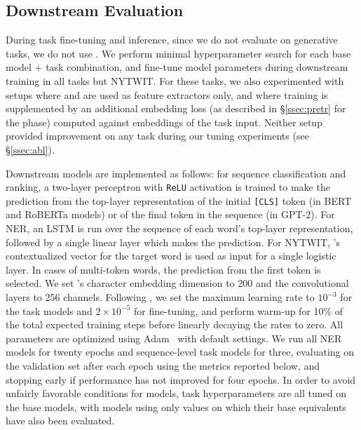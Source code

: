 

\subsection{Downstream Evaluation}
\label{ssec:finetune}

During task fine-tuning and inference,
since we do not evaluate on generative tasks, we do not use \detok{}.
We perform minimal hyperparameter search for each base model + task combination, and fine-tune model parameters during downstream training in all tasks but NYTWIT.
For these tasks, we also experimented with setups where \mmod{} and \tok{} are used as feature extractors only, and where \tok{} training is supplemented by an additional embedding loss (as described in \S\ref{ssec:pretr} for the \ppt{} phase) computed against embeddings of the task input.
Neither setup provided improvement on any task during our tuning experiments (see \S\ref{ssec:abl}).

Downstream models are implemented as follows: for sequence classification and ranking, a two-layer perceptron with \texttt{ReLU} activation is trained to make the prediction from the top-layer representation of the initial \texttt{[CLS]} token (in BERT and RoBERTa models) or of the final token in the sequence (in GPT-2).
For NER, an LSTM is run over the sequence of each word's top-layer representation, followed by a single linear layer which makes the prediction.
For NYTWIT, \mmod{}'s contextualized vector for the target word is used as input for a single logistic layer.
In cases of multi-token words, the prediction from the first token is selected.
We set \tok{}'s character embedding dimension to 200 and the convolutional layers to 256 channels.
Following , we set the maximum learning rate to $10^{-3}$ for the task models and $2\times 10^{-5}$ for fine-tuning, and perform warm-up for 10\% of the total expected training steps before linearly decaying the rates to zero.
All parameters are optimized using Adam~\cite{adam} with default settings.
We run all NER models for twenty epochs and sequence-level task models for three, evaluating on the validation set after each epoch using the metrics reported below, and stopping early if performance has not improved for four epochs.
In order to avoid unfairly favorable conditions for \tokdetok{} models, task hyperparameters are all tuned on the base models, with \tokdetok{} models using only values on which their base equivalents have also been evaluated.

